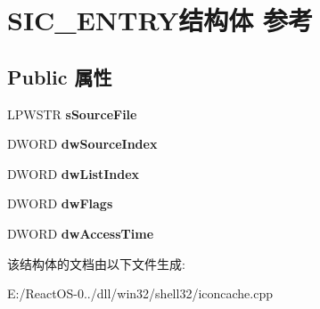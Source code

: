 \hypertarget{struct_s_i_c___e_n_t_r_y}{}\section{S\+I\+C\+\_\+\+E\+N\+T\+R\+Y结构体 参考}
\label{struct_s_i_c___e_n_t_r_y}
\subsection*{Public 属性}
\begin{DoxyCompactItemize}
\item 
\mbox{\label{struct_s_i_c___e_n_t_r_y_af35394173101a45b2c46b4f3d88aa77a}} 
L\+P\+W\+S\+TR {\bfseries s\+Source\+File}
\item 
\mbox{\label{struct_s_i_c___e_n_t_r_y_a5a90acededcbf3e61a62027454176623}} 
D\+W\+O\+RD {\bfseries dw\+Source\+Index}
\item 
\mbox{\label{struct_s_i_c___e_n_t_r_y_a95baf6f56db4f08d51f93436905eaa3a}} 
D\+W\+O\+RD {\bfseries dw\+List\+Index}
\item 
\mbox{\label{struct_s_i_c___e_n_t_r_y_a19c3b0973f09d74b18f26b739b57dd27}} 
D\+W\+O\+RD {\bfseries dw\+Flags}
\item 
\mbox{\label{struct_s_i_c___e_n_t_r_y_a926cc01b0dbaa77c33b4a5489cf59fdb}} 
D\+W\+O\+RD {\bfseries dw\+Access\+Time}
\end{DoxyCompactItemize}


该结构体的文档由以下文件生成\+:\begin{DoxyCompactItemize}
\item 
E\+:/\+React\+O\+S-\/0../dll/win32/shell32/iconcache.\+cpp\end{DoxyCompactItemize}
